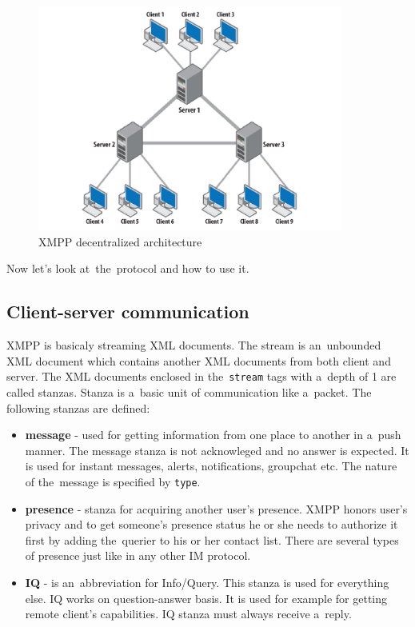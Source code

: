 \begin{figure}[ht]
\begin{center}
	\includegraphics[width=10cm]{fig/XMPP-decentralized-architecture.png}
	\caption{XMPP decentralized architecture \cite{xmppBook}}
	\label{fig:xmpp-decentralized-architecture}
\end{center}
\end{figure}

Now let's look at~the~protocol and how to use it. 

\subsection*{Client-server communication}
XMPP is basicaly streaming XML documents. The stream is an~unbounded XML document which contains another XML documents from both client and server. The XML documents enclosed in the~\verb|stream| tags with a~depth of 1 are called stanzas. Stanza is a~basic unit of communication like a~packet. The following stanzas are defined:

\begin{itemize}
	\item \textbf{message} - used for getting information from one place to another in a~push manner. The message stanza is not acknowleged and no answer is expected. It is used for instant messages, alerts, notifications, groupchat etc. The nature of the~message is specified by \verb|type|.  
	\item \textbf{presence} - stanza for acquiring another user's presence. XMPP honors user's privacy and to get someone's presence status he or she needs to authorize it first by adding the~querier to his or her contact list. There are several types of presence just like in any other IM protocol.     
	\item	\textbf{IQ} - is an~abbreviation for Info/Query. This stanza is used for everything else. IQ works on question-answer basis. It is used for example for getting remote client's capabilities. IQ stanza must always receive a~reply. 
\end{itemize}

